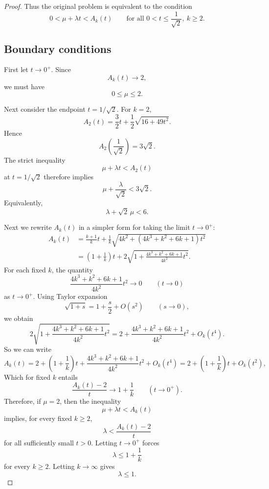 \documentclass[11pt]{article}
\begin{document}
\begin{proof}
Thus the original problem is equivalent to the condition
\[
0<\mu+\lambda t<A_k(t)
\qquad
\text{for all }0<t\le \frac1{\sqrt2},\ k\ge 2.
\]

\subsection*{Boundary conditions}

First let \(t\to 0^+\). Since
\[
A_k(t)\to 2,
\]
we must have
\[
0\le \mu\le 2.
\]

Next consider the endpoint \(t=1/\sqrt2\). For \(k=2\),
\[
A_2(t)
=
\frac32 t+\frac12\sqrt{16+49t^2}.
\]
Hence
\[
A_2\left(\frac1{\sqrt2}\right)
=3\sqrt2.
\]
The strict inequality
\[
\mu+\lambda t<A_2(t)
\]
at \(t=1/\sqrt2\) therefore implies
\[
\mu+\frac{\lambda}{\sqrt2}<3\sqrt2.
\]
Equivalently,
\[
\lambda+\sqrt2\,\mu<6.
\]

Next we rewrite $A_k(t)$ in a simpler form for taking the limit \(t\to 0^+\):
\[
\begin{aligned}
A_k(t)
&=
\frac{k+1}{k}t
+
\frac{1}{k}
\sqrt{
4k^2+\left(4k^3+k^2+6k+1\right)t^2
} \\
&=
\left(1+\frac1k\right)t
+
2\sqrt{
1+\frac{4k^3+k^2+6k+1}{4k^2}t^2
}.
\end{aligned}
\]
For each fixed \(k\), the quantity
\[
\frac{4k^3+k^2+6k+1}{4k^2}t^2 \to 0  \qquad (t\to 0)
\]
as \(t\to 0^+\). Using Taylor expansion
\[
\sqrt{1+s}=1+\frac{s}{2}+O(s^2)
\qquad (s\to 0),
\]
we obtain
\[
2\sqrt{
1+\frac{4k^3+k^2+6k+1}{4k^2}t^2
}
=
2+\frac{4k^3+k^2+6k+1}{4k^2}t^2+O_k(t^4).
\]
So we can write
\[
A_k(t)
=
2+\left(1+\frac1k\right)t
+\frac{4k^3+k^2+6k+1}{4k^2}t^2
+O_k(t^4)
=
2+\left(1+\frac1k\right)t+O_k(t^2),
\]
Which for fixed $k$ entails
\[
\frac{A_k(t)-2}{t}
\to
1+\frac1k
\qquad (t\to 0^+).
\]
Therefore, if \(\mu=2\), then the inequality
\[
\mu+\lambda t<A_k(t)
\]
implies, for every fixed \(k\ge 2\),
\[
\lambda
<
\frac{A_k(t)-2}{t}
\]
for all sufficiently small \(t>0\). Letting \(t\to 0^+\) forces
\[
\lambda\le 1+\frac1k
\]
for every \(k\ge 2\). Letting \(k\to\infty\) gives
\[
\lambda\le 1.
\]

\end{proof}
\end{document}
